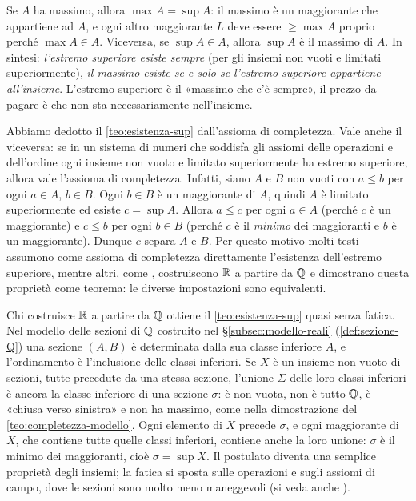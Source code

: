 \begin{osservazione}\label{oss:sup-max}
Se $A$ ha massimo, allora $\max A=\sup A$: il massimo è un maggiorante che appartiene ad
$A$, e ogni altro maggiorante $L$ deve essere $\ge\max A$ proprio perché $\max A\in A$.
Viceversa, se $\sup A\in A$, allora $\sup A$ è il massimo di $A$. In sintesi:
\emph{l'estremo superiore esiste sempre} (per gli insiemi non vuoti e limitati
superiormente), \emph{il massimo esiste se e solo se l'estremo superiore appartiene
all'insieme}. L'estremo superiore è il «massimo che c'è sempre», il prezzo da pagare è
che non sta necessariamente nell'insieme.
\end{osservazione}

\begin{osservazione}\label{oss:completezza-sup}
Abbiamo dedotto il \cref{teo:esistenza-sup} dall'assioma di completezza. Vale anche il
viceversa: se in un sistema di numeri che soddisfa gli assiomi delle operazioni e
dell'ordine ogni insieme non vuoto e limitato superiormente ha estremo superiore, allora
vale l'assioma di completezza. Infatti, siano $A$ e $B$ non vuoti con $a\le b$ per ogni
$a\in A$, $b\in B$. Ogni $b\in B$ è un maggiorante di $A$, quindi $A$ è limitato
superiormente ed esiste $c=\sup A$. Allora $a\le c$ per ogni $a\in A$ (perché $c$ è un
maggiorante) e $c\le b$ per ogni $b\in B$ (perché $c$ è il \emph{minimo} dei maggioranti
e $b$ è un maggiorante). Dunque $c$ separa $A$ e $B$. Per questo motivo molti testi assumono come assioma di
completezza direttamente l'esistenza dell'estremo superiore, mentre altri, come
\cite{tao1}, costruiscono $\mathbb{R}$ a partire da $\mathbb{Q}$ e dimostrano questa proprietà come
teorema: le diverse impostazioni sono equivalenti.
\end{osservazione}

\begin{osservazione}\label{oss:modello-dedekind}
Chi costruisce $\mathbb{R}$ a partire da $\mathbb{Q}$ ottiene il \cref{teo:esistenza-sup} quasi senza
fatica. Nel modello delle sezioni di $\mathbb{Q}$ costruito nel \S\ref{subsec:modello-reali}
(\cref{def:sezione-Q}) una sezione $(A,B)$ è determinata dalla sua classe inferiore $A$, e
l'ordinamento è l'inclusione delle classi inferiori. Se $X$ è un insieme non vuoto di
sezioni, tutte precedute da una stessa sezione, l'unione $\Sigma$ delle loro classi
inferiori è ancora la classe inferiore di una sezione $\sigma$: è non vuota, non è tutto
$\mathbb{Q}$, è «chiusa verso sinistra» e non ha massimo, come nella dimostrazione del
\cref{teo:completezza-modello}. Ogni elemento di $X$ precede $\sigma$, e ogni maggiorante
di $X$, che contiene tutte quelle classi inferiori, contiene anche la loro unione:
$\sigma$ è il minimo dei maggioranti, cioè $\sigma=\sup X$. Il postulato diventa una
semplice proprietà degli insiemi; la fatica si sposta sulle operazioni e sugli assiomi di
campo, dove le sezioni sono molto meno maneggevoli (si veda anche \cite{giusti}).
\end{osservazione}

